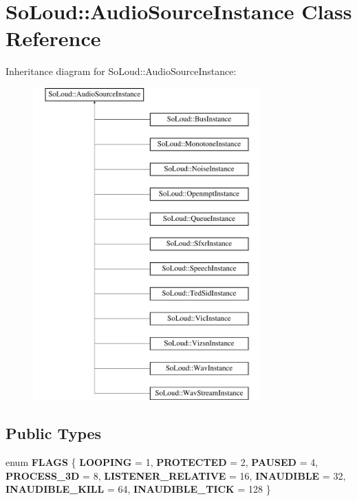 \hypertarget{class_so_loud_1_1_audio_source_instance}{}\section{So\+Loud\+::Audio\+Source\+Instance Class Reference}
\label{class_so_loud_1_1_audio_source_instance}
Inheritance diagram for So\+Loud\+::Audio\+Source\+Instance\+:\begin{figure}[H]
\begin{center}
\leavevmode
\includegraphics[height=12.000000cm]{class_so_loud_1_1_audio_source_instance}
\end{center}
\end{figure}
\subsection*{Public Types}
\begin{DoxyCompactItemize}
\item 
\mbox{\label{class_so_loud_1_1_audio_source_instance_a32c4206e75224bff3a904f300bcccc1d}} 
enum {\bfseries F\+L\+A\+GS} \{ \newline
{\bfseries L\+O\+O\+P\+I\+NG} = 1, 
{\bfseries P\+R\+O\+T\+E\+C\+T\+ED} = 2, 
{\bfseries P\+A\+U\+S\+ED} = 4, 
{\bfseries P\+R\+O\+C\+E\+S\+S\+\_\+3D} = 8, 
\newline
{\bfseries L\+I\+S\+T\+E\+N\+E\+R\+\_\+\+R\+E\+L\+A\+T\+I\+VE} = 16, 
{\bfseries I\+N\+A\+U\+D\+I\+B\+LE} = 32, 
{\bfseries I\+N\+A\+U\+D\+I\+B\+L\+E\+\_\+\+K\+I\+LL} = 64, 
{\bfseries I\+N\+A\+U\+D\+I\+B\+L\+E\+\_\+\+T\+I\+CK} = 128
 \}
\end{DoxyCompactItemize}
